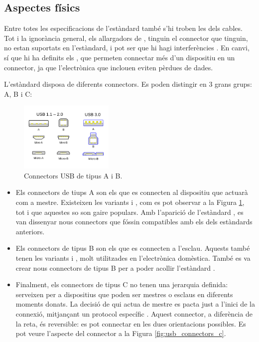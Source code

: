 \subsection{Aspectes físics}

Entre totes les especificacions de l'estàndard  també s'hi troben les
dels cables. Tot i la ignorància general, els allargadors de , tinguin
el connector que tinguin, no estan suportats en l'estàndard, i pot ser que
hi hagi interferències \cite{Contributors2024USB}. En canvi, sí que
hi ha definits els , que permeten connectar més d'un dispositiu en un
connector, ja que l'electrònica que inclouen eviten pèrdues de dades.

L'estàndard  disposa de diferents connectors. Es poden distingir en
3 grans grups: A, B i C:

\begin{figure}[ht]
    \centering
    \includegraphics[width=0.4\textwidth]{images/usb_connectors.png}
    \caption{Connectors USB de tipus A i B. \cite{Contributors2024USB}}
    \label{fig:usb_connectors}
\end{figure}

\begin{itemize}
    \item Els connectors de tiups A son els que es connecten al dispositiu
    que actuarà com a mestre. Existeixen les variants  i ,
    com es pot observar a la Figura \ref{fig:usb_connectors}, tot i que aquestes
    so son gaire populars. Amb l'aparició de l'estàndard , es van
    dissenyar nous connectors que fóssin compatibles amb els dels estàndards
    anteriors.
    \item Els connectors de tipus B son els que es connecten a l'esclau. Aquests
    també tenen les variants  i , molt utilitzades
    en l'electrònica domèstica. També es va crear nous connectors de tipus B
    per a poder acollir l'estàndard .
    \item Finalment, els connectors de tipus C no tenen una jerarquia definida:
    serveixen per a dispositius que poden ser mestres o esclaus en diferents
    moments donats. La decisió de qui actua de mestre es pacta just a l'inici
    de la connexió, mitjançant un protocol específic \cite{Axelson2015USB}.
    Aquest connector, a diferència de la reta, és reversible: es pot connectar
    en les dues orientacions possibles. Es pot veure l'aspecte del connector
    a la Figura \ref{fig:usb_connectors_c}.
\end{itemize}

